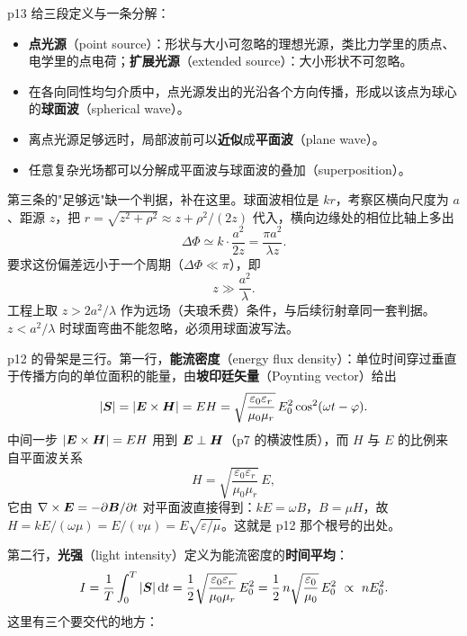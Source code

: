 \documentclass[10pt]{ctexart}
\begin{document}

p13 给三段定义与一条分解：
\begin{itemize}
\item \textbf{点光源}（point source）：形状与大小可忽略的理想光源，类比力学里的质点、电学里的点电荷；\textbf{扩展光源}（extended source）：大小形状不可忽略。
\item 在各向同性均匀介质中，点光源发出的光沿各个方向传播，形成以该点为球心的\textbf{球面波}（spherical wave）。
\item 离点光源足够远时，局部波前可以\textbf{近似}成\textbf{平面波}（plane wave）。
\item 任意复杂光场都可以分解成平面波与球面波的叠加（superposition）。
\end{itemize}

第三条的"足够远"缺一个判据，补在这里。球面波相位是 $kr$，考察区横向尺度为 $a$、距源 $z$，把 $r=\sqrt{z^2+\rho^2}\approx z+\rho^2/(2z)$ 代入，横向边缘处的相位比轴上多出
\[
\Delta\Phi\simeq k\cdot\frac{a^2}{2z}=\frac{\pi a^2}{\lambda z}.
\]
要求这份偏差远小于一个周期（$\Delta\Phi\ll \pi$），即
\[
z\gg\frac{a^2}{\lambda}.
\]
工程上取 $z>2a^2/\lambda$ 作为远场（夫琅禾费）条件，与后续衍射章同一套判据。$z<a^2/\lambda$ 时球面弯曲不能忽略，必须用球面波写法。



p12 的骨架是三行。第一行，\textbf{能流密度}（energy flux density）：单位时间穿过垂直于传播方向的单位面积的能量，由\textbf{坡印廷矢量}（Poynting vector）给出
\[
|\boldsymbol{S}|=|\boldsymbol{E}\times\boldsymbol{H}|=EH=\sqrt{\frac{\varepsilon_0\varepsilon_r}{\mu_0\mu_r}}\,E_0^2\cos^2(\omega t-\varphi).
\]
中间一步 $|\boldsymbol{E}\times\boldsymbol{H}|=EH$ 用到 $\boldsymbol{E}\perp\boldsymbol{H}$（p7 的横波性质），而 $H$ 与 $E$ 的比例来自平面波关系
\[
H=\sqrt{\frac{\varepsilon_0\varepsilon_r}{\mu_0\mu_r}}\,E ,
\]
它由 $\nabla\times\boldsymbol{E}=-\partial\boldsymbol{B}/\partial t$ 对平面波直接得到：$kE=\omega B$，$B=\mu H$，故 $H=kE/(\omega\mu)=E/(v\mu)=E\sqrt{\varepsilon/\mu}$。这就是 p12 那个根号的出处。

第二行，\textbf{光强}（light intensity）定义为能流密度的\textbf{时间平均}：
\[
I=\frac{1}{T}\int_0^T|\boldsymbol{S}|\,\mathrm{d} t
=\frac{1}{2}\sqrt{\frac{\varepsilon_0\varepsilon_r}{\mu_0\mu_r}}\,E_0^2
=\frac{1}{2}\,n\sqrt{\frac{\varepsilon_0}{\mu_0}}\,E_0^2
\ \propto\ nE_0^2 .
\]
这里有三个要交代的地方：
\end{document}
